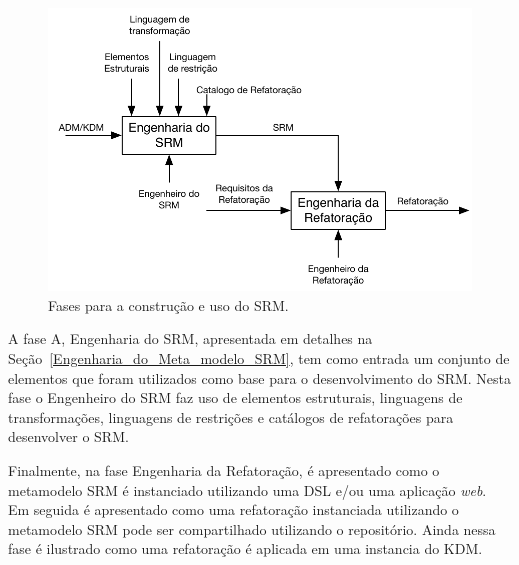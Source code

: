 \begin{figure}[h]
	\centering
	\caption{Fases para a construção e uso do SRM.}
	\label{fig:fases_para_a_construcao_e_uso_do_SRM}
	\includegraphics[scale=0.9]{images/fasesParaConstruirOSRM}
	\fautor
\end{figure}

A fase A, Engenharia do SRM, apresentada em detalhes na Seção~\ref{Engenharia_do_Meta_modelo_SRM}, tem como entrada um conjunto de elementos que foram utilizados como base para o desenvolvimento do SRM. Nesta fase o Engenheiro do SRM faz uso de elementos estruturais, linguagens de transformações, linguagens de restrições e catálogos de refatorações para desenvolver o SRM.



Finalmente, na fase Engenharia da Refatoração, é apresentado como o metamodelo SRM é instanciado utilizando uma DSL e/ou uma aplicação \textit{web}. Em seguida é apresentado como uma refatoração instanciada utilizando o metamodelo SRM pode ser compartilhado utilizando o repositório. Ainda nessa fase é ilustrado como uma refatoração é aplicada em uma instancia do KDM.

